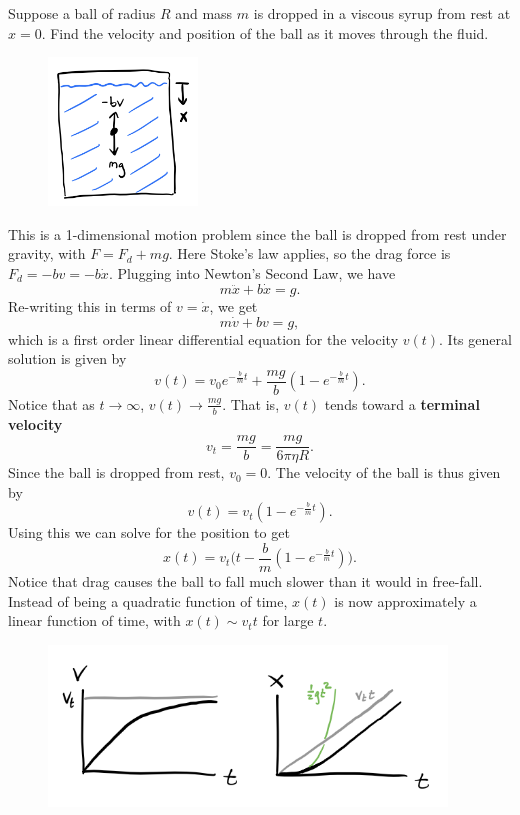 \documentclass[
  letterpaper,
  DIV=11,
  numbers=noendperiod]{scrreprt}
\begin{document}
Suppose a ball of radius \(R\) and mass \(m\) is dropped in a viscous
syrup from rest at \(x=0\). Find the velocity and position of the ball
as it moves through the fluid.

\begin{figure}

{\centering \includegraphics[width=1.5625in,height=\textheight]{classical-mechanics/./resources/image-20230214034514241.png}

}

\end{figure}

This is a 1-dimensional motion problem since the ball is dropped from
rest under gravity, with \(F=F_d + mg\). Here Stoke's law applies, so
the drag force is \(F_d = -bv = -b\dot x\). Plugging into Newton's
Second Law, we have \[
m\ddot x + b \dot x = g.
\] Re-writing this in terms of \(v = \dot x\), we get \[
m \dot v + bv = g,
\] which is a first order linear differential equation for the velocity
\(v(t)\). Its general solution is given by \[
v(t) = v_0 e^{-\frac{b}{m}t} + \frac{mg}{b}(1-e^{-\frac{b}{m}t}).
\] Notice that as \(t \rightarrow \infty\),
\(v(t) \rightarrow \frac{mg}{b}\). That is, \(v(t)\) tends toward a
\textbf{terminal velocity} \[
v_t = \frac{mg}{b} = \frac{mg}{6\pi\eta R}.
\] Since the ball is dropped from rest, \(v_0=0\). The velocity of the
ball is thus given by \[
v(t) = v_t(1-e^{-\frac{b}{m}t}).
\] Using this we can solve for the position to get \[
x(t) = v_t\bigg(t - \frac{b}{m}(1 - e^{-\frac{b}{m}t})\bigg).
\] Notice that drag causes the ball to fall much slower than it would in
free-fall. Instead of being a quadratic function of time, \(x(t)\) is
now approximately a linear function of time, with \(x(t) \sim v_t t\)
for large \(t\).

\begin{figure}

{\centering \includegraphics[width=4.16667in,height=\textheight]{classical-mechanics/./resources/image-20230214043325681.png}

}

\end{figure}
\end{document}

